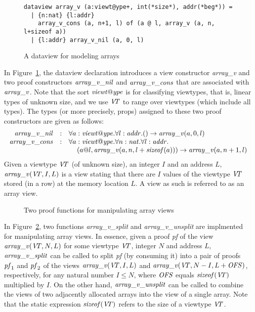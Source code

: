 \begin{figure}[thp]
\begin{verbatim}
dataview array_v (a:viewt@ype+, int(*size*), addr(*beg*)) =
  | {n:nat} {l:addr}
    array_v_cons (a, n+1, l) of (a @ l, array_v (a, n, l+sizeof a))
  | {l:addr} array_v_nil (a, 0, l)
\end{verbatim}
\caption{A dataview for modeling arrays}
\label{figure:dataview_array_v.dats}
\end{figure}
In Figure~\ref{figure:dataview_array_v.dats}, the dataview declaration
introduces a view constructor {\it array\_v} and two proof constructors
${\it array\_v\_nil}$ and ${\it array\_v\_cons}$ that are associated with
${\it array\_v}$.  Note that the sort ${\it viewt@ype}$ is for classifying
viewtypes, that is, linear types of unknown size, and we use ${\it V\!\!T}$ to range
over viewtypes (which include all types).  The types (or more precisely, props)
assigned to these two proof constructors are given as follows:
\[\begin{array}{rcl}
{\it array\_v\_nil} & : &
\forall a:{\it viewt@ype}.\forall l:{\it addr}. () \rightarrow {\it array\_v} (a, 0, l) \\
{\it array\_v\_cons} & : &
\forall a:{\it viewt@ype}.\forall n:{\it nat}.\forall l:{\it addr}. \\
&&\kern12pt
(a @ l, {\it array\_v} (a, n, l+{\it sizeof}(a))) \rightarrow {\it array\_v} (a, n+1, l) \\
\end{array}\]
Given a viewtype ${\it V\!\!T}$ (of unknown size), an integer $I$ and an address
$L$, ${\it array\_v}({\it V\!\!T}, I, L)$ is a view stating that there are $I$
values of the viewtype ${\it V\!\!T}$ stored (in a row) at the memory location
$L$. A view as such is referred to as an array view.

\begin{figure}

\caption{Two proof functions for manipulating array views}
\label{figure:array_v_split_unsplit.dats}
\end{figure}
In Figure~\ref{figure:array_v_split_unsplit.dats}, two functions {\it
array\_v\_split} and {\it array\_v\_unsplit} are implmented for
manipulating array views. In essence, given a proof {\it pf} of the view
${\it array\_v} ({\it V\!\!T}, N, L)$ for some viewtype ${\it V\!\!T}$, integer $N$ and
address $L$, ${\it array\_v\_split}$ can be called to split {\it pf} (by
consuming it) into a pair of proofs ${\it pf}_1$ and ${\it pf}_2$ of the
views ${\it array\_v} ({\it V\!\!T}, I, L)$ and ${\it array\_v} ({\it V\!\!T}, N-I, L+{\it
OFS})$, respectively, for any natural number $I\leq N$, where ${\it OFS}$ equals
${\it sizeof}({\it V\!\!T})$ multiplied by $I$. On the other hand, ${\it
array\_v\_unsplit}$ can be called to combine the views of two adjacently
allocated arrays into the view of a single array.  Note that the static
expression ${\it sizeof}({\it V\!\!T})$ refers to the size of a viewtype ${\it V\!\!T}$.


